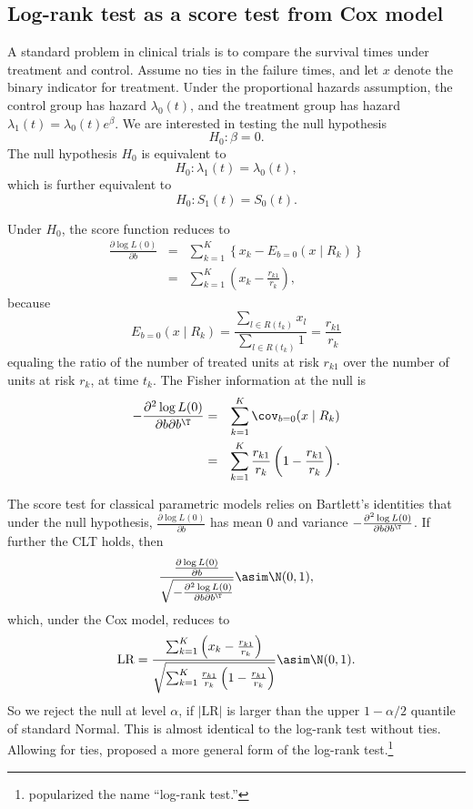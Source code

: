\subsection{Log-rank test as a score test from Cox model}


A standard problem in clinical trials is to compare the survival times under treatment and control. Assume no ties in the failure times, and let $x$ denote the binary indicator for treatment. 
Under the proportional hazards assumption, the
control group has hazard $\lambda_{0}(t)$, and the treatment group has
hazard $\lambda_{1}(t) = \lambda_{0}(t)e^{\beta}.$ We are interested in testing the null hypothesis 
$$
H_0: \beta=0 .
$$
The null hypothesis $H_0$ is equivalent to
$$
H_0:  \lambda_{1}(t) = \lambda_{0}(t),
$$
which is further equivalent to
$$
H_0:  S_{1}(t) = S_{0}(t).
$$

 

Under $H_0$, the score function reduces to
\begin{eqnarray*}
\frac{\partial\log L(0)}{\partial b}  
&=&\sum_{k=1}^{K}\left\{ x_{k}-E_{b=0}(x\mid R_{k})\right\} \\
&=&\sum_{k=1}^{K}\left(x_{k}-\frac{r_{k1}}{r_{k}}\right),
\end{eqnarray*}
because 
\[
E_{b=0}(x\mid R_{k})=\frac{\sum_{l\in R(t_{k})}x_{l}}{\sum_{l\in R(t_{k})}1}=\frac{r_{k1}}{r_{k}}
\]
equaling the ratio of the number of treated units at risk $r_{k1}$ over the
number of units at risk $r_k$, at time $t_k$. The Fisher information at the null is
\begin{eqnarray*}
-\frac{\partial^{2}\log L( 0 )}{\partial b \partial b^{\T}} 
&=& \sum_{k=1}^{K}\cov_{b=0}(x\mid R_{k}) \\
&=& \sum_{k=1}^{K}\frac{r_{k1}}{r_{k}}\left(1-\frac{r_{k1}}{r_{k}}\right).
\end{eqnarray*}

The score test for classical parametric models relies on  Bartlett's identities that under the null hypothesis,  $\frac{\partial\log L( 0 )}{\partial b}$ has mean 0 and variance $-\frac{\partial^{2}\log L( 0 )}{\partial b\partial b^{\T}}  $. If further the CLT holds, then 
$$
\frac{ \frac{\partial\log L( 0 )}{\partial b}  }{  \sqrt{ -\frac{\partial^{2}\log L( 0 )}{\partial b \partial b^{\T}}   } }
\asim\N(0,1),
$$
which, under the Cox model, reduces to
\[
\text{LR} = \frac{\sum_{k=1}^{K}\left(x_{k}-\frac{r_{k1}}{r_{k}}\right)}{\sqrt{\sum_{k=1}^{K}\frac{r_{k1}}{r_{k}}\left(1-\frac{r_{k1}}{r_{k}}\right)}}\asim\N(0,1).
\]
So we reject the null at level $\alpha$, if $|\text{LR} | $ is larger than the upper $1-\alpha/2$ quantile of standard Normal. This
is almost identical to the log-rank test without ties. Allowing for ties, \citet{mantel1966evaluation} proposed a more general form of the log-rank test.\footnote{\citet{peto1972asymptotically} popularized the name ``log-rank test.''}


